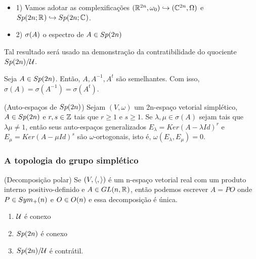 \documentclass{beamer}
\begin{document}
	\begin{frame}
		\begin{itemize}
			\item 1) Vamos adotar as complexificações $(\mathbb{R}^{2n}, \omega_{0}) \hookrightarrow (\mathbb{C}^{2n}, \Omega)$ e $Sp(2n;\mathbb{R}^{}) \hookrightarrow Sp(2n; \mathbb{C}^{})$. 
			
			\item 2) $\sigma(A)$ o espectro de $A \in Sp(2n)$ 
		\end{itemize}	
		
		\begin{tiny}
			Tal resultado será usado na demonstração da contratibilidade do quociente $Sp(2n)/\mathcal{U}$.
			
		\end{tiny}
		\begin{lema}
			Seja $A \in Sp(2n)$. Então, $A, A^{-1}, A^{t}$ são semelhantes. Com isso, $\sigma(A) = \sigma(A^{-1}) = \sigma(A^{t}) $.
		\end{lema}
		
		
		\begin{lema}
			(Auto-espaços de $Sp(2n)$) Sejam $(V, \omega)$ um 2n-espaço vetorial simplético, $A \in Sp(2n)$ e $r,s \in \mathbb{Z}$ tais que $r\geq 1$ e $s\geq 1$. Se $\lambda, \mu \in \sigma(A)$ sejam tais que $\lambda\mu \neq 1$, então seus auto-espaços generalizados $E_{\lambda}=Ker(A-\lambda Id)^{r}$ e  $E_{\mu}=Ker(A-\mu Id)^{s}$ são $\omega$-ortogonais, isto é, $\omega(E_{\lambda}, E_{\mu}) = 0$.
		\end{lema}
		
	\end{frame}
	
	\begin{frame}
		\frametitle{A topologia do grupo simplético}
		
		\begin{teorema}
			(Decomposição polar) Se $(V, \langle ,  \rangle)$ é um n-espaço vetorial real com um produto interno positivo-definido e $A \in GL(n, \mathbb{R}^{})$, então podemos escrever $A=PO$ onde $P \in  Sym_{+}(n)$ e $O \in O(n)$ e essa decomposição é única.
		\end{teorema}
		\begin{enumerate}
			\item $\mathcal{U}$ é conexo
			
			\item $Sp(2n)$ é conexo
			
			\item $Sp(2n)/\mathcal{U}$ é contrátil.
		\end{enumerate}
	\end{frame}
	
\end{document}
